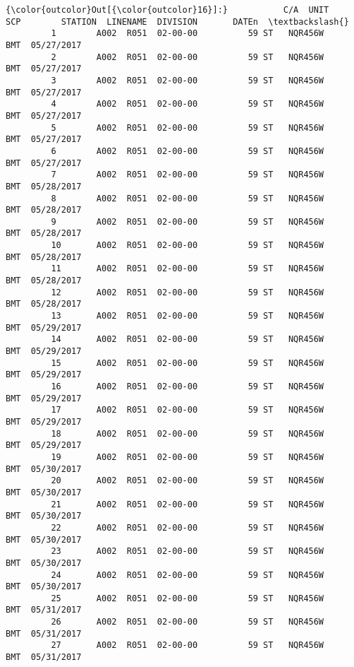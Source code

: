 \documentclass[11pt]{article}
\begin{document}
\begin{Verbatim}[commandchars=\\\{\}]
{\color{outcolor}Out[{\color{outcolor}16}]:}           C/A  UNIT       SCP        STATION  LINENAME  DIVISION       DATEn  \textbackslash{}
         1        A002  R051  02-00-00          59 ST   NQR456W       BMT  05/27/2017   
         2        A002  R051  02-00-00          59 ST   NQR456W       BMT  05/27/2017   
         3        A002  R051  02-00-00          59 ST   NQR456W       BMT  05/27/2017   
         4        A002  R051  02-00-00          59 ST   NQR456W       BMT  05/27/2017   
         5        A002  R051  02-00-00          59 ST   NQR456W       BMT  05/27/2017   
         6        A002  R051  02-00-00          59 ST   NQR456W       BMT  05/27/2017   
         7        A002  R051  02-00-00          59 ST   NQR456W       BMT  05/28/2017   
         8        A002  R051  02-00-00          59 ST   NQR456W       BMT  05/28/2017   
         9        A002  R051  02-00-00          59 ST   NQR456W       BMT  05/28/2017   
         10       A002  R051  02-00-00          59 ST   NQR456W       BMT  05/28/2017   
         11       A002  R051  02-00-00          59 ST   NQR456W       BMT  05/28/2017   
         12       A002  R051  02-00-00          59 ST   NQR456W       BMT  05/28/2017   
         13       A002  R051  02-00-00          59 ST   NQR456W       BMT  05/29/2017   
         14       A002  R051  02-00-00          59 ST   NQR456W       BMT  05/29/2017   
         15       A002  R051  02-00-00          59 ST   NQR456W       BMT  05/29/2017   
         16       A002  R051  02-00-00          59 ST   NQR456W       BMT  05/29/2017   
         17       A002  R051  02-00-00          59 ST   NQR456W       BMT  05/29/2017   
         18       A002  R051  02-00-00          59 ST   NQR456W       BMT  05/29/2017   
         19       A002  R051  02-00-00          59 ST   NQR456W       BMT  05/30/2017   
         20       A002  R051  02-00-00          59 ST   NQR456W       BMT  05/30/2017   
         21       A002  R051  02-00-00          59 ST   NQR456W       BMT  05/30/2017   
         22       A002  R051  02-00-00          59 ST   NQR456W       BMT  05/30/2017   
         23       A002  R051  02-00-00          59 ST   NQR456W       BMT  05/30/2017   
         24       A002  R051  02-00-00          59 ST   NQR456W       BMT  05/30/2017   
         25       A002  R051  02-00-00          59 ST   NQR456W       BMT  05/31/2017   
         26       A002  R051  02-00-00          59 ST   NQR456W       BMT  05/31/2017   
         27       A002  R051  02-00-00          59 ST   NQR456W       BMT  05/31/2017   

\end{Verbatim}
\end{document}
